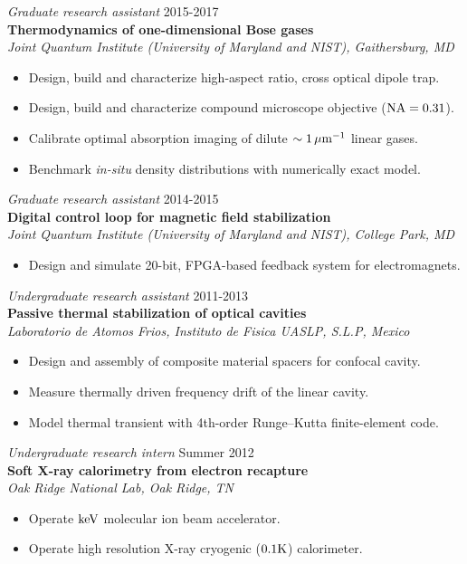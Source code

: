\documentclass[margin]{res} %
\begin{document}
\begin{resume}
{\sl Graduate research assistant} \hfill 2015-2017 \\
{\bf Thermodynamics of one-dimensional Bose gases} \\
{\it Joint Quantum Institute (University of Maryland and NIST), Gaithersburg, MD}
\begin{itemize} \itemsep -2pt
\item Design, build and characterize high-aspect ratio, cross optical dipole trap.
\item Design, build and characterize compound microscope objective (${{\rm NA} = 0.31}$).
\item Calibrate optimal absorption imaging of dilute ${\sim 1 \,{\rm \mu m ^{-1}}}$ linear gases.
\item Benchmark {\it in-situ} density distributions with numerically exact model.
\end{itemize} 

{\sl Graduate research assistant} \hfill 2014-2015 \\
{\bf Digital control loop for magnetic field stabilization}\\
{\it Joint Quantum Institute (University of Maryland and NIST), College Park, MD}
\begin{itemize} \itemsep -2pt
\item Design and simulate 20-bit, FPGA-based feedback system for electromagnets.
\end{itemize} 

{\sl Undergraduate research assistant} \hfill 2011-2013 \\
{\bf Passive thermal stabilization of optical cavities}\\
{\it Laboratorio de Atomos Frios, Instituto de Fisica UASLP, S.L.P, Mexico}
\begin{itemize} \itemsep -2pt
\item Design and assembly of composite material spacers for confocal cavity.
\item Measure thermally driven frequency drift of the linear cavity. 
\item Model thermal transient with 4th-order Runge--Kutta finite-element code.
\end{itemize}
 
{\sl Undergraduate research intern} \hfill Summer 2012 \\
{\bf Soft X-ray calorimetry from electron recapture}\\
{\it Oak Ridge National Lab, Oak Ridge, TN}
\begin{itemize} \itemsep -2pt
\item Operate ${{\rm keV}}$ molecular ion beam accelerator.
\item Operate high resolution X-ray cryogenic (${0.1 {\rm K}}$) calorimeter.
\end{itemize}


\end{resume}
\end{document}
